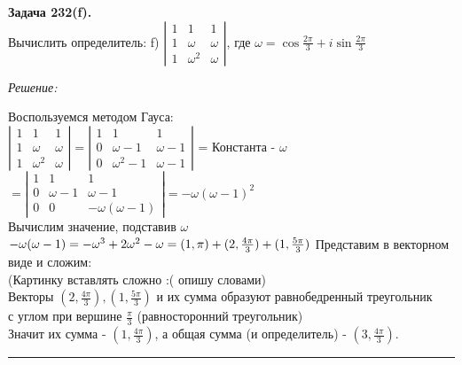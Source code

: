 \documentclass[a4paper, 12pt]{article}
\newenvironment{problem}[2][Задача]
    { \begin{mdframed}[backgroundcolor=gray!10] \textbf{#1 #2.} \\}
    {  \end{mdframed}}
\newenvironment{solution}
    {\textit{Решение: }}
    {\noindent\rule{7in}{1.5pt}}
\begin{document}
\begin{problem}{232(f)}
Вычислить определитель:
f) $\left| \begin{array}{rrr}1 & 1 & 1 \\ 1 & \omega & \omega\\1 & \omega^2 & \omega \end{array} \right|$,
где $\omega=\cos\frac{2\pi}{3}+i\sin\frac{2\pi}{3}$
\end{problem}
\begin{solution}

Воспользуемся методом Гауса: \\
$
\left|
\begin{array}{rrr}
1 & 1 & 1 \\
1 & \omega & \omega \\
1 & \omega^2 & \omega
\end{array}
\right|
=
\left|
\begin{array}{rrr}
1 & 1 & 1 \\
0 & \omega - 1 & \omega - 1 \\
0 & \omega^2 - 1 & \omega - 1
\end{array}
\right|
$
= Константа - $\omega$
$
=
\left|
\begin{array}{rrr}
1 & 1 & 1 \\
0 & \omega - 1 & \omega - 1 \\
0 & 0 & -\omega(\omega - 1)
\end{array}
\right|
= -\omega(\omega - 1)^2
$ \\
Вычислим значение, подставив $\omega$ \\
$
-\omega(\omega - 1) = -\omega^3 + 2\omega^2 - \omega = (1, \pi) + (2, \frac{4\pi}{3}) + (1, \frac{5\pi}{3}) \\
$
Представим в векторном виде и сложим: \\
(Картинку вставлять сложно :( опишу словами) \\
Векторы $(2, \frac{4\pi}{3}), (1, \frac{5\pi}{3})$ и их сумма образуют равнобедренный треугольник \\ с углом при вершине $\frac{\pi}{3}$ (равносторонний треугольник) \\
Значит их сумма - $(1, \frac{4\pi}{3})$, а общая сумма (и определитель) - $(3, \frac{4\pi}{3})$.

\end{solution} 
\end{document}

